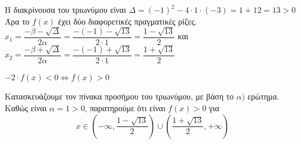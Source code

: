 
\begin{alist}
\item Η διακρίνουσα του τριωνύμου είναι $\Delta = (-1)^2 - 4 \cdot 1 \cdot (-3) = 1 + 12 = 13 > 0$
Άρα το $f(x)$ έχει δύο διαφορετικές πραγματικές ρίζες.
$x_1 = \dfrac{-\beta - \sqrt{\Delta}}{2\alpha} = \dfrac{-(-1) - \sqrt{13}}{2 \cdot 1} = \dfrac{1 - \sqrt{13}}{2}$ και $x_2 = \dfrac{-\beta + \sqrt{\Delta}}{2\alpha} = \dfrac{-(-1) + \sqrt{13}}{2 \cdot 1} = \dfrac{1 + \sqrt{13}}{2}$

\item $-2 \cdot f(x) < 0 \Leftrightarrow f(x) > 0$

Κατασκευάζουμε τον πίνακα προσήμου του τριωνύμου, με βάση το $\alpha)$ ερώτημα.
Καθώς είναι $\alpha = 1 > 0$, παρατηρούμε ότι είναι $f(x) > 0$ για
\[x \in \left(-\infty , \dfrac{1 - \sqrt{13}}{2}\right) \cup \left(\dfrac{1 + \sqrt{13}}{2} , +\infty \right)\]

\begin{center}
\end{center}
\end{alist}

